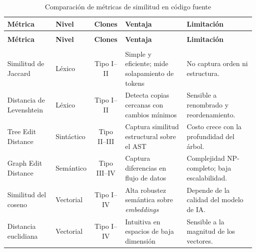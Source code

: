 { 
\renewcommand{\arraystretch}{1.6}
\small 

\begin{xltabular}{\textwidth}{>{\raggedright\arraybackslash}p{2.8cm} l c >{\raggedright\arraybackslash}X >{\raggedright\arraybackslash}X}
    \caption{Comparación de métricas de similitud en código fuente} \label{tab:metricas} \\
    
    \toprule
    \textbf{Métrica} & \textbf{Nivel} & \textbf{Clones} & \textbf{Ventaja} & \textbf{Limitación} \\
    \midrule
    \endfirsthead

     \\
    \toprule
    \textbf{Métrica} & \textbf{Nivel} & \textbf{Clones} & \textbf{Ventaja} & \textbf{Limitación} \\
    \midrule
    \endhead

    \midrule
     \\
    \endfoot

    \bottomrule
    \endlastfoot

    Similitud de Jaccard & Léxico & Tipo I--II & Simple y eficiente; mide solapamiento de tokens \cite{Roy2007Survey} & No captura orden ni estructura. \\
    \addlinespace
    Distancia de Levenshtein & Léxico & Tipo I--II & Detecta copias cercanas con cambios mínimos \cite{Roy2007Survey} & Sensible a renombrado y reordenamiento. \\
    \addlinespace
    Tree Edit Distance & Sintáctico & Tipo II--III & Captura similitud estructural sobre el AST \cite{Song2024AST} & Costo crece con la profundidad del árbol. \\
    \addlinespace
    Graph Edit Distance & Semántico & Tipo III--IV & Captura diferencias en flujo de datos \cite{Yu2023Graph} & Complejidad NP-completo; baja escalabilidad. \\
    \addlinespace
    Similitud del coseno & Vectorial & Tipo I--IV & Alta robustez semántica sobre \textit{embeddings} \cite{Alon2018Code2Vec, Lu2026CSSG} & Depende de la calidad del modelo de IA. \\
    \addlinespace
    Distancia euclidiana & Vectorial & Tipo I--IV & Intuitiva en espacios de baja dimensión \cite{Lu2026CSSG} & Sensible a la magnitud de los vectores. \\

\end{xltabular}
}
\normalsize

